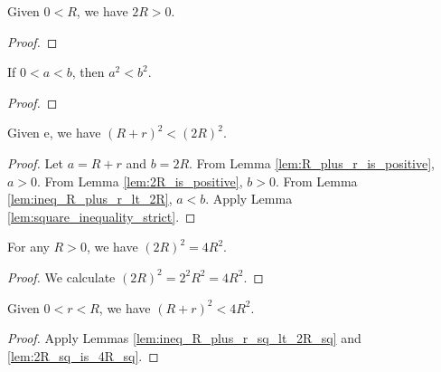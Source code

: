 
\begin{lemma}\label{lem:2R_is_positive} \leanok
Given $0 < R$, we have $2R > 0$.
\end{lemma}
\begin{proof}\leanok
\end{proof}


\begin{lemma}\label{lem:square_inequality_strict} \leanok
If $0 < a < b$, then $a^2 < b^2$.
\end{lemma}
\begin{proof}\leanok
\end{proof}


\begin{lemma}\label{lem:ineq_R_plus_r_sq_lt_2R_sq} \leanok
Given e, we have $(R+r)^2 < (2R)^2$.
\end{lemma}
\begin{proof}\leanok
{}
Let $a = R+r$ and $b = 2R$. From Lemma \ref{lem:R_plus_r_is_positive}, $a>0$. From Lemma \ref{lem:2R_is_positive}, $b>0$. From Lemma \ref{lem:ineq_R_plus_r_lt_2R}, $a<b$. Apply Lemma \ref{lem:square_inequality_strict}.
\end{proof}


\begin{lemma}\label{lem:2R_sq_is_4R_sq} \leanok
For any $R>0$, we have $(2R)^2 = 4R^2$.
\end{lemma}
\begin{proof}\leanok
We calculate $(2R)^2 = 2^2 R^2 = 4R^2$.
\end{proof}


\begin{lemma}\label{lem:ineq_R_plus_r_sq} \leanok
Given $0 < r < R$, we have $(R+r)^2 < 4R^2$.
\end{lemma}
\begin{proof}\leanok
{}
Apply Lemmas \ref{lem:ineq_R_plus_r_sq_lt_2R_sq} and \ref{lem:2R_sq_is_4R_sq}.
\end{proof}

